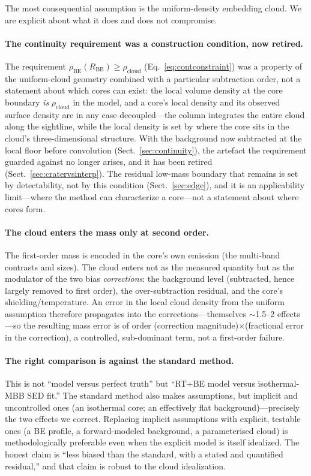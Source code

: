 \documentclass[11pt,a4paper]{article}
\newcommand{\Rbe}{R_{\mathrm{BE}}}
\newcommand{\rhocloud}{\rho_{\mathrm{cloud}}}
\begin{document}
The most consequential assumption is the uniform-density embedding cloud.
We are explicit about what it does and does not compromise.

\paragraph{The continuity requirement was a construction condition, now
retired.} The requirement $\rho_{\mathrm{BE}}(\Rbe)\ge\rhocloud$
(Eq.~\ref{eq:contconstraint}) was a property of the uniform-cloud geometry
combined with a particular subtraction order, not a statement about which
cores can exist: the local volume density at the core boundary \emph{is}
$\rhocloud$ in the model, and a core's local density and its observed surface
density are in any case decoupled---the column integrates the entire cloud
along the sightline, while the local density is set by where the core sits in
the cloud's three-dimensional structure. With the background now subtracted at
the local floor before convolution (Sect.~\ref{sec:continuity}), the artefact
the requirement guarded against no longer arises, and it has been retired
(Sect.~\ref{sec:cratervsinterp}). The residual low-mass boundary that remains
is set by detectability, not by this condition (Sect.~\ref{sec:edge}), and it
is an applicability limit---where the method can characterize a core---not a
statement about where cores form.

\paragraph{The cloud enters the mass only at second order.}
The first-order mass is encoded in the core's own emission (the multi-band
contrasts and sizes). The cloud enters not as the measured quantity but as
the modulator of the two bias \emph{corrections}: the background level
(subtracted, hence largely removed to first order), the over-subtraction
residual, and the core's shielding/temperature. An error in the local cloud
density from the uniform assumption therefore propagates into the
corrections---themselves $\sim$1.5--2 effects---so the resulting mass error
is of order (correction magnitude)$\times$(fractional error in the
correction), a controlled, sub-dominant term, not a first-order failure.

\paragraph{The right comparison is against the standard method.}
This is not ``model versus perfect truth'' but ``RT$+$BE model versus
isothermal-MBB SED fit.'' The standard method also makes assumptions, but
implicit and uncontrolled ones (an isothermal core; an effectively flat
background)---precisely the two effects we correct. Replacing implicit
assumptions with explicit, testable ones (a BE profile, a forward-modeled
background, a parameterised cloud) is methodologically preferable even when
the explicit model is itself idealized. The honest claim is ``less biased
than the standard, with a stated and quantified residual,'' and that claim
is robust to the cloud idealization.
\end{document}
